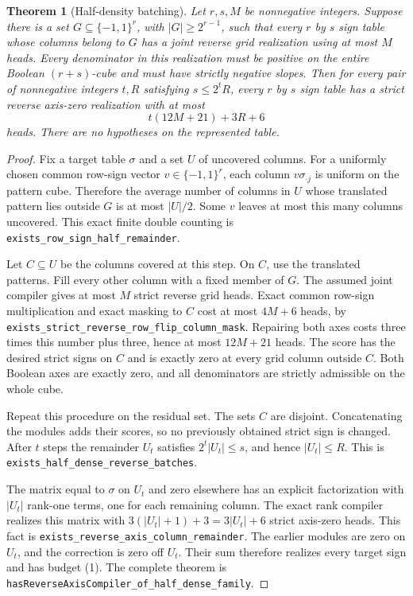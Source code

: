 \documentclass[11pt]{article}
\newtheorem{theorem}{Theorem}
\begin{document}
\begin{theorem}[Half-density batching]
Let $r,s,M$ be nonnegative integers. Suppose there is a set
$G\subseteq\{-1,1\}^r$, with $|G|\geq2^{r-1}$, such that every
$r$ by $s$ sign table whose columns belong to $G$ has a joint reverse
grid realization using at most $M$ heads. Every denominator in this
realization must be positive on the entire Boolean $(r+s)$-cube and
must have strictly negative slopes. Then for every pair of nonnegative
integers $t,R$ satisfying $s\leq2^tR$, every $r$ by $s$ sign table has
a strict reverse axis-zero realization with at most
\[
 t(12M+21)+3R+6                                           \tag{1}
\]
heads. There are no hypotheses on the represented table.
\end{theorem}
\begin{proof}
Fix a target table $\sigma$ and a set $U$ of uncovered columns. For a
uniformly chosen common row-sign vector $v\in\{-1,1\}^r$, each
column $v\sigma_{\cdot j}$ is uniform on the pattern cube. Therefore
the average number of columns in $U$ whose translated pattern lies
outside $G$ is at most $|U|/2$. Some $v$ leaves at most this many
columns uncovered. This exact finite double counting is
\texttt{exists\_row\_sign\_half\_remainder}.

Let $C\subseteq U$ be the columns covered at this step. On $C$, use
the translated patterns. Fill every other column with a fixed member
of $G$. The assumed joint compiler gives at most $M$ strict reverse
grid heads. Exact common row-sign multiplication and exact masking to
$C$ cost at most $4M+6$ heads, by
\texttt{exists\_strict\_reverse\_row\_flip\_column\_mask}.
Repairing both axes costs three times this number plus three, hence
at most $12M+21$ heads. The score has the desired strict signs on $C$
and is exactly zero at every grid column outside $C$. Both Boolean
axes are exactly zero, and all denominators are strictly admissible
on the whole cube.

Repeat this procedure on the residual set. The sets $C$ are disjoint.
Concatenating the modules adds their scores, so no previously obtained
strict sign is changed. After $t$ steps the remainder $U_t$ satisfies
$2^t|U_t|\leq s$, and hence $|U_t|\leq R$. This is
\texttt{exists\_half\_dense\_reverse\_batches}.

The matrix equal to $\sigma$ on $U_t$ and zero elsewhere has an
explicit factorization with $|U_t|$ rank-one terms, one for each
remaining column. The exact rank compiler realizes this matrix with
$3(|U_t|+1)+3=3|U_t|+6$ strict axis-zero heads. This fact is
\texttt{exists\_reverse\_axis\_column\_remainder}. The earlier
modules are zero on $U_t$, and the correction is zero off $U_t$.
Their sum therefore realizes every target sign and has budget (1).
The complete theorem is
\texttt{hasReverseAxisCompiler\_of\_half\_dense\_family}.
\end{proof}
\end{document}
